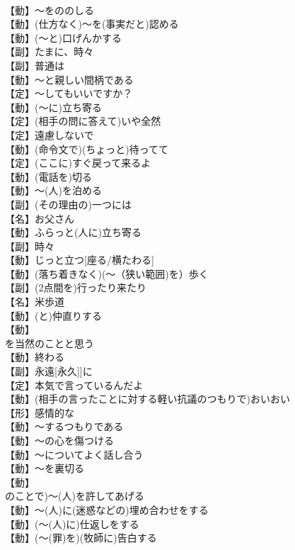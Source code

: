 \documentclass[8pt]{extreport}
\begin{document}
\begin{CJK}{UTF8}{min}
\\	【動】～をののしる
\\	【動】(仕方なく)～を(事実だと)認める
\\	【動】(～と)口げんかする
\\	【副】たまに、時々
\\	【副】普通は
\\	【動】～と親しい間柄である
\\	【定】～してもいいですか？
\\	【動】(～に)立ち寄る
\\	【定】(相手の問に答えて)いや全然
\\	【定】遠慮しないで
\\	【動】(命令文で)(ちょっと)待ってて
\\	【定】(ここに)すぐ戻って来るよ
\\	【動】(電話を)切る
\\	【動】～(人)を泊める
\\	【副】(その理由の)一つには
\\	【名】お父さん
\\	【動】ふらっと(人に)立ち寄る
\\	【副】時々
\\	【動】じっと立つ[座る/横たわる]
\\	【動】(落ち着きなく)(～（狭い範囲)を）歩く
\\	【副】(2点間を)行ったり来たり
\\	【名】{米}歩道
\\	【動】(と)仲直りする
\\	【動】
\\	を当然のことと思う
\\	【動】終わる
\\	【副】永遠[永久]]に
\\	【定】本気で言っているんだよ
\\	【動】(相手の言ったことに対する軽い抗議のつもりで)おいおい
\\	【形】感情的な
\\	【動】～するつもりである
\\	【動】～の心を傷つける
\\	【動】～についてよく話し合う
\\	【動】～を裏切る
\\	【動】
\\	のことで)～(人)を許してあげる
\\	【動】～(人)に(迷惑などの)埋め合わせをする
\\	【動】(～(人)に)仕返しをする
\\	【動】(～(罪)を)(牧師に)告白する

\end{CJK}
\end{document}
